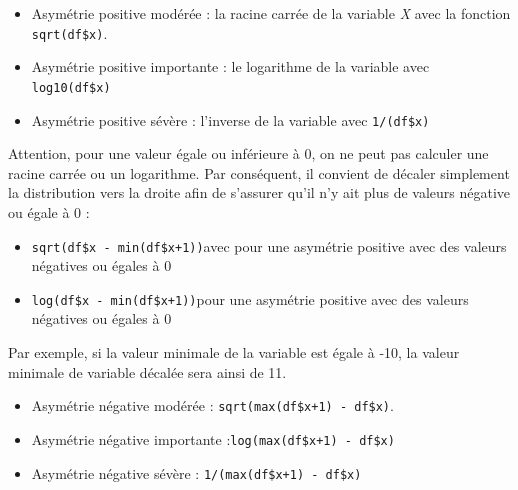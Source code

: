 \documentclass[
  11pt,
  french,
]{book}
\makeatletter
\providecommand{\tightlist}{%
  \setlength{\itemsep}{0pt}\setlength{\parskip}{0pt}}
\newenvironment{kframev}{%
\medskip{}
\setlength{\fboxsep}{.8em}
 \def\at@end@of@kframev{}%
 \ifinner\ifhmode%
  \def\at@end@of@kframev{\end{minipage}}%
  \begin{minipage}{\columnwidth}%
 \fi\fi%
 \def\FrameCommand##1{\hskip\@totalleftmargin \hskip-\fboxsep
 \colorbox{shadebluecolor}{##1}\hskip-\fboxsep
     \hskip-\linewidth \hskip-\@totalleftmargin \hskip\columnwidth}%
 \MakeFramed {\advance\hsize-\width
   \@totalleftmargin\z@ \linewidth\hsize
   \@setminipage}}%
 {\par\unskip\endMakeFramed%
 \at@end@of@kframev}
\newenvironment{rmdblock}[1]
  {
  \begin{itemize}
  \renewcommand{\labelitemi}{
    \raisebox{-.7\height}[0pt][0pt]{
      {\setkeys{Gin}{width=3em,keepaspectratio}\texttt{[image: images/\#1]}}
    }
  }
  \setlength{\fboxsep}{1em}
  \begin{kframev}
  \small
  \item
  }
  {
  \end{kframev}
  \end{itemize}
  }
\newenvironment{bloc_astuce}
  {\begin{rmdblock}{astuce}}
  {\end{rmdblock}}
\makeatother
\begin{document}
\begin{itemize}
\tightlist
\item
  Asymétrie positive modérée : la racine carrée de la variable \emph{X} avec la fonction \texttt{sqrt(df\$x)}.
\item
  Asymétrie positive importante : le logarithme de la variable avec \texttt{log10(df\$x)}
\item
  Asymétrie positive sévère : l'inverse de la variable avec \texttt{1/(df\$x)}
\end{itemize}

\begin{bloc_astuce}

Attention, pour une valeur égale ou inférieure à 0, on ne peut pas calculer une racine carrée ou un logarithme. Par conséquent, il convient de décaler simplement la distribution vers la droite afin de s'assurer qu'il n'y ait plus de valeurs négative ou égale à 0 :

\begin{itemize}
\tightlist
\item
  \texttt{sqrt(df\$x\ -\ min(df\$x+1))}avec pour une asymétrie positive avec des valeurs négatives ou égales à 0
\item
  \texttt{log(df\$x\ -\ min(df\$x+1))}pour une asymétrie positive avec des valeurs négatives ou égales à 0
\end{itemize}

Par exemple, si la valeur minimale de la variable est égale à -10, la valeur minimale de variable décalée sera ainsi de 11.

\begin{itemize}
\tightlist
\item
  Asymétrie négative modérée : \texttt{sqrt(max(df\$x+1)\ -\ df\$x)}.
\item
  Asymétrie négative importante :\texttt{log(max(df\$x+1)\ -\ df\$x)}
\item
  Asymétrie négative sévère : \texttt{1/(max(df\$x+1)\ -\ df\$x)}
\end{itemize}


\end{bloc_astuce}
\end{document}
